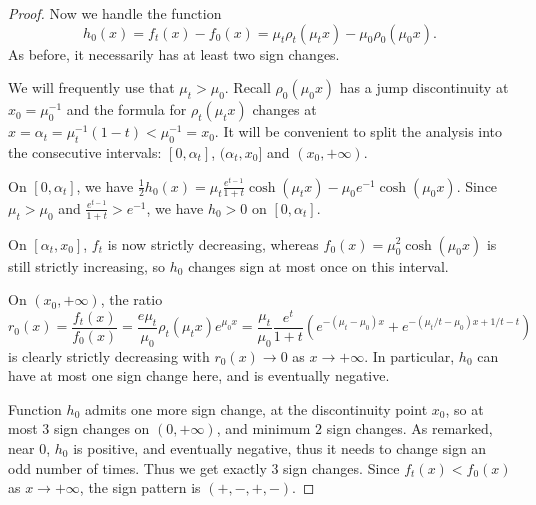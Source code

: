\documentclass[10pt]{amsart}
\newcommand{\1}{\textbf{1}}
\newcommand{\red}{}
\theoremstyle{remark}
\theoremstyle{definition}
\begin{document}
\begin{proof}
Now we handle the function
\[
h_0(x) = f_t(x) - f_0(x) = \mu_t\rho_t(\mu_tx) - \mu_0\rho_0(\mu_0x).
\]
As before, it necessarily has at least two sign changes.

We will frequently use that $\mu_t > \mu_0$. Recall $\rho_0(\mu_0x)$ has a jump discontinuity at $x_0 = \mu_0^{-1}$ and the formula for $\rho_t(\mu_tx)$ changes at $x = \alpha_t = \mu_t^{-1}(1-t) < \mu_0^{-1} = x_0$. It will be convenient to split the analysis into the consecutive intervals: $[0, \alpha_t]$, $(\alpha_t, x_0]$ and $(x_0,+ \infty)$.

On $[0, \alpha_t]$, we have $\frac12 h_0(x) = \mu_t\frac{e^{t-1}}{1+t}\cosh(\mu_tx) - \mu_0e^{-1}\cosh(\mu_0x)$. Since $\mu_t > \mu_0$ and $\frac{e^{t-1}}{1+t} > e^{-1}$, we have $h_0 > 0$ on $[0, \alpha_t]$.

On $[\alpha_t, x_0]$, $f_t$ is now strictly decreasing, whereas $f_0(x) = \mu_0^2\cosh(\mu_0 x)$ is still strictly increasing, so $h_0$ changes sign at most once on this interval.

On $(x_0, {+\infty})$, the ratio 
\[
r_0(x) = \frac{f_t(x)}{f_0(x)} = \frac{e\mu_t}{\mu_0}\rho_t(\mu_tx)e^{\mu_0x} = \frac{\mu_t}{\mu_0}\frac{e^t}{1+t}\left(e^{-(\mu_t-\mu_0)x} +e^{-(\mu_t/t-\mu_0)x + 1/t-t} \right)
\]
is clearly strictly decreasing with $r_0(x) \to 0$ as $x \to {+\infty}$. In particular, $h_0$ can have at most one sign change here, and is eventually negative. 

Function $h_0$ admits one more sign change, at the discontinuity point $x_0$, so at most $3$ sign changes on $(0, {+\infty})$, and minimum $2$ sign changes. As remarked, near $0$, $h_0$ is positive, and eventually negative, thus it {\red needs to} change sign an odd number of times. Thus we get exactly $3$ sign changes. Since $f_t(x) < f_0(x)$ as $x \to {+\infty}$, the sign pattern is $(+,-,+,-)$.

\end{proof}
\end{document}
